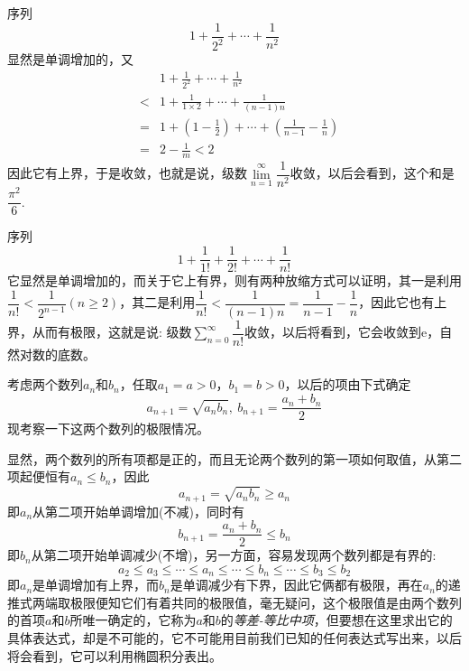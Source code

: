 \begin{example}
  序列
  \[ 1+\frac{1}{2^2}+\cdots+\frac{1}{n^2} \]
  显然是单调增加的，又
  \begin{eqnarray*}
    && 1+\frac{1}{2^2}+\cdots+\frac{1}{n^2} \\
    & < & 1 + \frac{1}{1\times 2}+\cdots+\frac{1}{(n-1)n} \\
    & = & 1+\left( 1-\frac{1}{2} \right)+\cdots+\left( \frac{1}{n-1}-\frac{1}{n} \right) \\
    & = & 2-\frac{1}{m} < 2
  \end{eqnarray*}
  因此它有上界，于是收敛，也就是说，级数$\lim\limits_{n=1}^{\infty}\dfrac{1}{n^2}$收敛，以后会看到，这个和是$\dfrac{\pi^2}{6}$.
\end{example}

\begin{example}
  序列
  \[ 1+\frac{1}{1!} + \frac{1}{2!} + \cdots + \frac{1}{n!} \]
  它显然是单调增加的，而关于它上有界，则有两种放缩方式可以证明，其一是利用$\dfrac{1}{n!}<\dfrac{1}{2^{n-1}}(n \geqslant 2)$，其二是利用$\dfrac{1}{n!}<\dfrac{1}{(n-1)n}=\dfrac{1}{n-1}-\dfrac{1}{n}$，因此它也有上界，从而有极限，这就是说: 级数$\sum\limits_{n=0}^{\infty} \dfrac{1}{n!}$收敛，以后将看到，它会收敛到$\mathrm{e}$，自然对数的底数。
\end{example}

\begin{example}[等差-等比中项]
  \label{example:arithmetic-gemotry-mid-term}
  考虑两个数列$a_n$和$b_n$，任取$a_1=a>0$，$b_1=b>0$，以后的项由下式确定
  \[ a_{n+1} = \sqrt{a_nb_n}, \  b_{n+1}=\frac{a_n+b_n}{2} \]
  现考察一下这两个数列的极限情况。

  显然，两个数列的所有项都是正的，而且无论两个数列的第一项如何取值，从第二项起便恒有$a_n \leqslant b_n$，因此
  \[ a_{n+1} = \sqrt{a_nb_n} \geqslant a_n \]
  即$a_n$从第二项开始单调增加(不减)，同时有
  \[ b_{n+1} = \frac{a_n+b_n}{2} \leqslant b_n \]
  即$b_n$从第二项开始单调减少(不增)，另一方面，容易发现两个数列都是有界的:
  \[ a_2 \leqslant a_3 \leqslant \cdots \leqslant a_n \leqslant \cdots \leqslant b_n \leqslant \cdots \leqslant b_3 \leqslant b_2  \]
  即$a_n$是单调增加有上界，而$b_n$是单调减少有下界，因此它俩都有极限，再在$a_n$的递推式两端取极限便知它们有着共同的极限值，毫无疑问，这个极限值是由两个数列的首项$a$和$b$所唯一确定的，它称为$a$和$b$的\emph{等差-等比中项}，但要想在这里求出它的具体表达式，却是不可能的，它不可能用目前我们已知的任何表达式写出来，以后将会看到，它可以利用椭圆积分表出。
\end{example}

